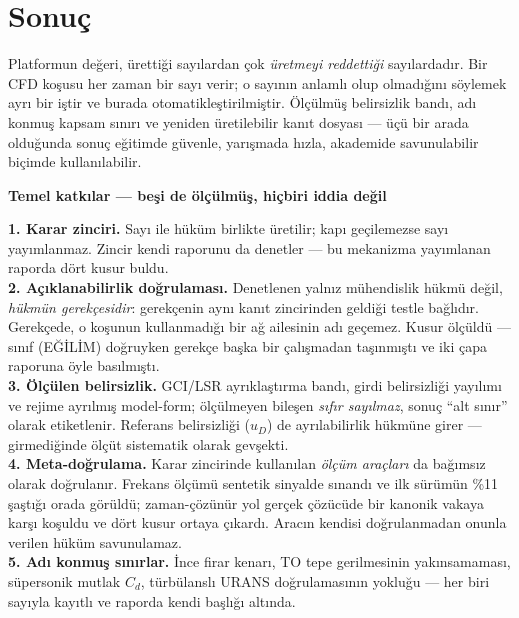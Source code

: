 \documentclass[11pt,a4paper]{article}
\newcommand{\kkkenar}{lacivert}
\newcommand{\kkzemin}{kod}
\newenvironment{renkkutu}[3]{%
  \renewcommand{\kkkenar}{#1}\renewcommand{\kkzemin}{#2}%
  \par\medskip\noindent
  \begin{lrbox}{\kutugovde}%
  \begin{minipage}{\dimexpr\linewidth-2\fboxsep-2\fboxrule\relax}\footnotesize
  \textcolor{#1}{\textbf{#3}}\par\vspace{3pt}%
}{%
  \end{minipage}%
  \end{lrbox}%
  \noindent\fcolorbox{\kkkenar}{\kkzemin}{\usebox{\kutugovde}}%
  \par\medskip
}
\newenvironment{olculdu}[1]{\begin{renkkutu}{iyi}{iyibg}{#1}}{\end{renkkutu}}
\begin{document}
\section{Sonuç}

Platformun değeri, ürettiği sayılardan çok \emph{üretmeyi reddettiği}
sayılardadır. Bir CFD koşusu her zaman bir sayı verir; o sayının anlamlı olup
olmadığını söylemek ayrı bir iştir ve burada otomatikleştirilmiştir. Ölçülmüş
belirsizlik bandı, adı konmuş kapsam sınırı ve yeniden üretilebilir kanıt
dosyası --- üçü bir arada olduğunda sonuç eğitimde güvenle, yarışmada hızla,
akademide savunulabilir biçimde kullanılabilir.

\begin{olculdu}{Temel katkılar --- beşi de ölçülmüş, hiçbiri iddia değil}
\textbf{1. Karar zinciri.} Sayı ile hüküm birlikte üretilir; kapı geçilemezse
sayı yayımlanmaz. Zincir kendi raporunu da denetler --- bu mekanizma yayımlanan
raporda dört kusur buldu.\\[2pt]
\textbf{2. Açıklanabilirlik doğrulaması.} Denetlenen yalnız mühendislik hükmü
değil, \emph{hükmün gerekçesidir}: gerekçenin aynı kanıt zincirinden geldiği
testle bağlıdır. Gerekçede, o koşunun kullanmadığı bir ağ ailesinin adı
geçemez. Kusur ölçüldü --- sınıf (EĞİLİM) doğruyken gerekçe başka bir
çalışmadan taşınmıştı ve iki çapa raporuna öyle basılmıştı.\\[2pt]
\textbf{3. Ölçülen belirsizlik.} GCI/LSR ayrıklaştırma bandı, girdi
belirsizliği yayılımı ve rejime ayrılmış model-form; ölçülmeyen bileşen
\emph{sıfır sayılmaz}, sonuç ``alt sınır'' olarak etiketlenir. Referans
belirsizliği ($u_D$) de ayrılabilirlik hükmüne girer --- girmediğinde ölçüt
sistematik olarak gevşekti.\\[2pt]
\textbf{4. Meta-doğrulama.} Karar zincirinde kullanılan \emph{ölçüm araçları}
da bağımsız olarak doğrulanır. Frekans ölçümü sentetik sinyalde sınandı ve ilk
sürümün \%11 şaştığı orada görüldü; zaman-çözünür yol gerçek çözücüde bir
kanonik vakaya karşı koşuldu ve dört kusur ortaya çıkardı. Aracın kendisi
doğrulanmadan onunla verilen hüküm savunulamaz.\\[2pt]
\textbf{5. Adı konmuş sınırlar.} İnce firar kenarı, TO tepe gerilmesinin
yakınsamaması, süpersonik mutlak $C_d$, türbülanslı URANS doğrulamasının
yokluğu --- her biri sayıyla kayıtlı ve raporda kendi başlığı altında.
\end{olculdu}
\end{document}
